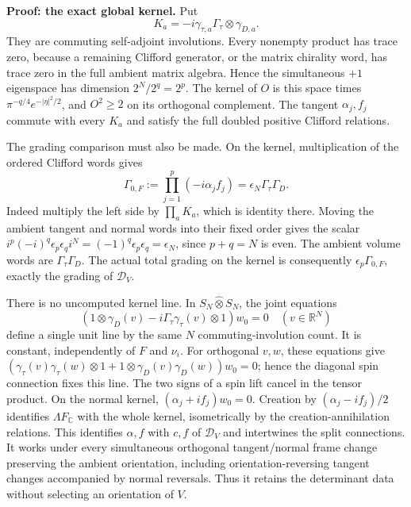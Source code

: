 \documentclass[
  11pt,
]{article}
\begin{document}
\textbf{Proof: the exact global kernel.} Put \[
 K_a=-i\gamma_{\tau,a}\Gamma_\tau\otimes\gamma_{D,a}.
 \tag{4.4}
\] They are commuting self-adjoint involutions. Every nonempty product
has trace zero, because a remaining Clifford generator, or the matrix
chirality word, has trace zero in the full ambient matrix algebra. Hence
the simultaneous \(+1\) eigenspace has dimension \(2^N/2^q=2^p\). The
kernel of \(O\) is this space times \(\pi^{-q/4}e^{-|\eta|^2/2}\), and
\(O^2\ge2\) on its orthogonal complement. The tangent \(\alpha_j,f_j\)
commute with every \(K_a\) and satisfy the full doubled positive
Clifford relations.

The grading comparison must also be made. On the kernel, multiplication
of the ordered Clifford words gives \[
 \Gamma_{0,F}:=\prod_{j=1}^p(-i\alpha_jf_j)
       =\epsilon_N\Gamma_\tau\Gamma_D.
 \tag{4.5}
\] Indeed multiply the left side by \(\prod_aK_a\), which is identity
there. Moving the ambient tangent and normal words into their fixed
order gives the scalar
\(i^p(-i)^q\epsilon_p\epsilon_q i^N=(-1)^q\epsilon_p\epsilon_q=\epsilon_N\),
since \(p+q=N\) is even. The ambient volume words are
\(\Gamma_\tau\Gamma_D\). The actual total grading on the kernel is
consequently \(\epsilon_p\Gamma_{0,F}\), exactly the grading of
\(\mathscr D_V\).

There is no uncomputed kernel line. In \(S_N\widehat\otimes S_N\), the
joint equations \[
 (1\otimes\gamma_D(v)-i\Gamma_\tau\gamma_\tau(v)\otimes1)w_0=0
 \quad(v\in\mathbb R^N)
 \tag{4.6}
\] define a single unit line by the same \(N\) commuting-involution
count. It is constant, independently of \(F\) and \(\nu_i\). For
orthogonal \(v,w\), these equations give
\((\gamma_\tau(v)\gamma_\tau(w)\otimes1+1\otimes\gamma_D(v)\gamma_D(w))w_0=0\);
hence the diagonal spin connection fixes this line. The two signs of a
spin lift cancel in the tensor product. On the normal kernel,
\((\alpha_j+i f_j)w_0=0\). Creation by \((\alpha_j-i f_j)/2\) identifies
\(\Lambda F_{\mathbb{C}}\) with the whole kernel, isometrically by the
creation-annihilation relations. This identifies \(\alpha,f\) with
\(c,f\) of \(\mathscr D_V\) and intertwines the split connections. It
works under every simultaneous orthogonal tangent/normal frame change
preserving the ambient orientation, including orientation-reversing
tangent changes accompanied by normal reversals. Thus it retains the
determinant data without selecting an orientation of \(V\).
\end{document}
